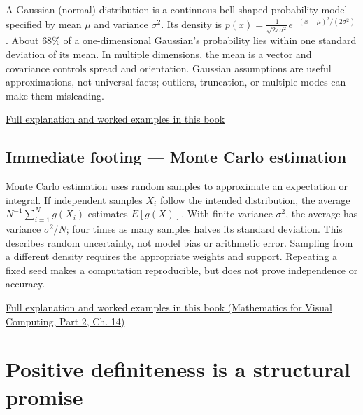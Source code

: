 \hypertarget{01-foundations-i-ch020-immediate-footing-gaussian-distribution}{}

A Gaussian (normal) distribution is a continuous bell-shaped probability model specified by mean \(\mu\) and variance \(\sigma^2\). Its density is \(p(x)=\frac{1}{\sqrt{2\pi\sigma^2}}e^{-(x-\mu)^2/(2\sigma^2)}\). About \(68\%\) of a one-dimensional Gaussian's probability lies within one standard deviation of its mean. In multiple dimensions, the mean is a vector and covariance controls spread and orientation. Gaussian assumptions are useful approximations, not universal facts; outliers, truncation, or multiple modes can make them misleading.

\hyperref[02-foundations-ii-ch023-discrete-and-continuous-distribution-families]{Full explanation and worked examples in this book}

\subsection{Immediate footing --- Monte Carlo estimation}\label{01-foundations-i-ch020-immediate-footing-monte-carlo-estimation}

\hypertarget{01-foundations-i-ch020-immediate-footing-monte-carlo-estimation}{}

Monte Carlo estimation uses random samples to approximate an expectation or integral. If independent samples \(X_i\) follow the intended distribution, the average \(N^{-1}\sum_{i=1}^N g(X_i)\) estimates \(E[g(X)]\). With finite variance \(\sigma^2\), the average has variance \(\sigma^2/N\); four times as many samples halves its standard deviation. This describes random uncertainty, not model bias or arithmetic error. Sampling from a different density requires the appropriate weights and support. Repeating a fixed seed makes a computation reproducible, but does not prove independence or accuracy.

\href{../02-Mathematics-for-Visual-Computing-P02/main.pdf\#nameddest=02-foundations-ii-ch030-monte-carlo-estimates-trade-computation-for-uncertainty}{Full explanation and worked examples in this book (Mathematics for Visual Computing, Part 2, Ch. 14)}

\section{Positive definiteness is a structural promise}\label{01-foundations-i-ch020-positive-definiteness-is-a-structural-promise}

